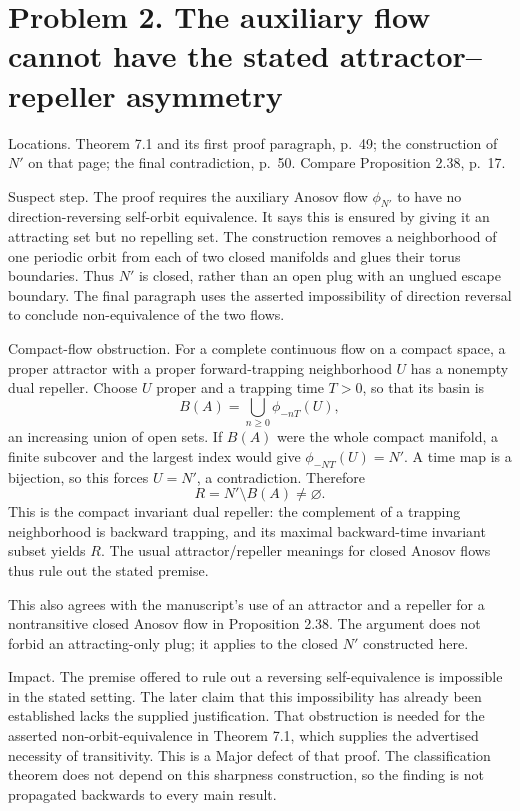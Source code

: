 \documentclass[10pt]{article}
\begin{document}
\section*{Problem 2. The auxiliary flow cannot have the stated attractor–repeller asymmetry}
Locations. Theorem 7.1 and its first proof paragraph, p. 49; the construction of \(N'\) on that page; the final contradiction, p. 50. Compare Proposition 2.38, p. 17.\par
Suspect step. The proof requires the auxiliary Anosov flow \(\phi_{N'}\) to have no direction-reversing self-orbit equivalence. It says this is ensured by giving it an attracting set but no repelling set. The construction removes a neighborhood of one periodic orbit from each of two closed manifolds and glues their torus boundaries. Thus \(N'\) is closed, rather than an open plug with an unglued escape boundary. The final paragraph uses the asserted impossibility of direction reversal to conclude non-equivalence of the two flows.\par
Compact-flow obstruction. For a complete continuous flow on a compact space, a proper attractor with a proper forward-trapping neighborhood \(U\) has a nonempty dual repeller. Choose \(U\) proper and a trapping time \(T>0\), so that its basin is \[B(A)=\bigcup_{n\geq0}\phi_{-nT}(U),\] an increasing union of open sets. If \(B(A)\) were the whole compact manifold, a finite subcover and the largest index would give \(\phi_{-NT}(U)=N'\). A time map is a bijection, so this forces \(U=N'\), a contradiction. Therefore \[R=N'\setminus B(A)\ne\varnothing .\] This is the compact invariant dual repeller: the complement of a trapping neighborhood is backward trapping, and its maximal backward-time invariant subset yields \(R\). The usual attractor/repeller meanings for closed Anosov flows thus rule out the stated premise.\par
This also agrees with the manuscript’s use of an attractor and a repeller for a nontransitive closed Anosov flow in Proposition 2.38. The argument does not forbid an attracting-only plug; it applies to the closed \(N'\) constructed here.\par
Impact. The premise offered to rule out a reversing self-equivalence is impossible in the stated setting. The later claim that this impossibility has already been established lacks the supplied justification. That obstruction is needed for the asserted non-orbit-equivalence in Theorem 7.1, which supplies the advertised necessity of transitivity. This is a Major defect of that proof. The classification theorem does not depend on this sharpness construction, so the finding is not propagated backwards to every main result.\par
\end{document}

